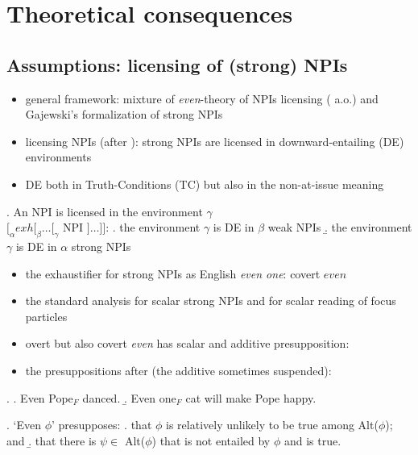 \documentclass[
  letterpaper,
  DIV=11,
  numbers=noendperiod]{scrartcl}
\providecommand{\tightlist}{%
  \setlength{\itemsep}{0pt}\setlength{\parskip}{0pt}}\usepackage{longtable,booktabs,array}
\begin{document}
\hypertarget{theoretical-consequences}{%
\section{Theoretical consequences}\label{theoretical-consequences}}

\hypertarget{assumptions-licensing-of-strong-npis}{%
\subsection{Assumptions: licensing of (strong)
NPIs}\label{assumptions-licensing-of-strong-npis}}

\begin{itemize}
\tightlist
\item
  general framework: mixture of \emph{even}-theory of NPIs licensing
  (\cite{krifka1995semantics,lahiri1998focus,crnivc2014non} a.o.) and
  Gajewski's formalization of strong NPIs \cite{gajewski2011licensing}
\item
  licensing NPIs (after \textcite{gajewski2011licensing}): strong NPIs
  are licensed in downward-entailing (DE) environments
\item
  DE both in Truth-Conditions (TC) but also in the non-at-issue meaning
\end{itemize}

\ex. An NPI is licensed in the environment \(\gamma\)\\
\([_\alpha exh [_\beta \ldots [_\gamma\) NPI \(] \ldots ]]\): \a. the
environment \(\gamma\) is DE in \(\beta\) \hfill weak NPIs \b. the
environment \(\gamma\) is DE in \(\alpha\) \hfill strong NPIs

\begin{itemize}
\tightlist
\item
  the exhaustifier for strong NPIs as English \emph{even one}: covert
  \(even\)
\item
  the standard analysis for scalar strong NPIs
  \textcite{crnivc2014against} and for scalar reading of focus particles
  \textcite{panizza2020minimal}
\item
  overt but also covert \emph{even} has scalar \Next[a] and additive
  \Next[b] presupposition:
\item
  the presuppositions after \textcite{panizza2020minimal} (the additive
  sometimes suspended):
\end{itemize}

\ex. \a. Even Pope\(_F\) danced. \b. Even one\(_F\) cat will make Pope
happy.

\ex. `Even \(\phi\)' presupposes: \a. that \(\phi\) is relatively
unlikely to be true among Alt(\(\phi\)); and \b. that there is
\(\psi \in\) Alt(\(\phi\)) that is not entailed by \(\phi\) and is true.
\end{document}
